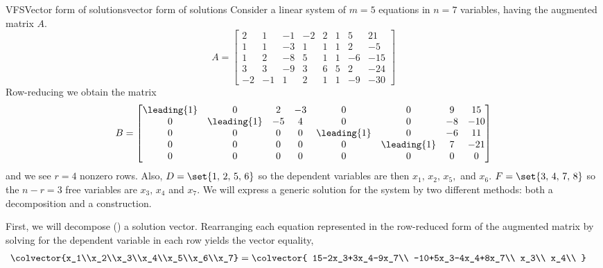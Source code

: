 \begin{example}{VFS}{Vector form of solutions}{vector form of solutions}
Consider a linear system of $m=5$ equations in $n=7$ variables, having the augmented matrix $A$.
%
\begin{equation*}
A=
\begin{bmatrix}
 2 & 1 & -1 & -2 & 2 & 1 & 5 & 21 \\
 1 & 1 & -3 & 1 & 1 & 1 & 2 & -5 \\
 1 & 2 & -8 & 5 & 1 & 1 & -6 & -15 \\
 3 & 3 & -9 & 3 & 6 & 5 & 2 & -24 \\
 -2 & -1 & 1 & 2 & 1 & 1 & -9 & -30
\end{bmatrix}
\end{equation*}
%
Row-reducing we obtain the matrix
%
\begin{equation*}
B=
\begin{bmatrix}
 \leading{1} & 0 & 2 & -3 & 0 & 0 & 9 &  15 \\
 0 & \leading{1} & -5 & 4 & 0 & 0 & -8 &  -10 \\
 0 & 0 & 0 & 0 & \leading{1} & 0 & -6 &  11 \\
 0 & 0 & 0 & 0 & 0 & \leading{1} & 7 &  -21 \\
 0 & 0 & 0 & 0 & 0 & 0 & 0 & 0
\end{bmatrix}
\end{equation*}
%
and we see $r=4$ nonzero rows. Also, $D=\set{1,\,2,\,5,\,6}$ so the dependent variables are then $x_1,\,x_2,\,x_5,$ and $x_6$.  $F=\set{3,\,4,\,7,\,8}$ so the $n-r=3$ free variables are $x_3,\,x_4$ and $x_7$.  We will express a generic solution for the system by two different methods: both a decomposition and a construction.\par
%
First, we will decompose () a solution vector.  Rearranging each equation represented in the row-reduced form of the augmented matrix by solving for the dependent variable in each row yields the vector equality,
%
\begin{align*}
\colvector{x_1\\x_2\\x_3\\x_4\\x_5\\x_6\\x_7}&=
\colvector{
15-2x_3+3x_4-9x_7\\
-10+5x_3-4x_4+8x_7\\
x_3\\
x_4\\
}
\end{align*}
\end{example}
